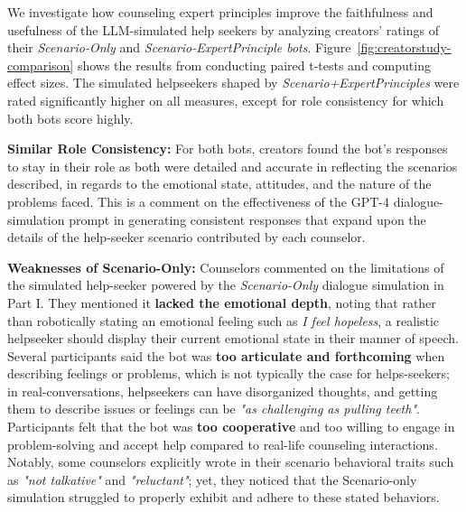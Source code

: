 We investigate how counseling expert principles improve the faithfulness and usefulness of the LLM-simulated help seekers by analyzing creators' ratings of their {\em Scenario-Only} and {\em Scenario-ExpertPrinciple bots}.  Figure~\ref{fig:creatorstudy-comparison} shows the results from conducting paired t-tests and computing effect sizes. The simulated helpseekers shaped by \textit{Scenario+ExpertPrinciples} were rated significantly higher on all measures, except for role consistency for which both bots score highly.

\textbf{Similar Role Consistency:} For both bots, creators found the bot's responses to stay in their role as both were detailed and accurate in reflecting the scenarios described, in regards to the emotional state, attitudes, and the nature of the problems faced. This is a comment on the effectiveness of the GPT-4 dialogue-simulation prompt in generating consistent responses that expand upon the details of the help-seeker scenario contributed by each counselor.

\textbf{Weaknesses of Scenario-Only:} 
Counselors commented on the limitations of the simulated help-seeker powered by the \textit{Scenario-Only} dialogue simulation in Part I. They mentioned it \textbf{lacked the emotional depth}, noting that rather than robotically stating an emotional feeling such as \textit{I feel hopeless}, a realistic helpseeker should display their current emotional state in their manner of speech. 
 Several participants said the bot was \textbf{too articulate and forthcoming} when describing feelings or problems, which is not typically the case for helps-seekers; in real-conversations, helpseekers can have disorganized thoughts, and getting them to describe issues or feelings can be \textit{"as challenging as pulling teeth"}. Participants felt that the bot was \textbf{too cooperative} and too willing to engage in problem-solving and accept help compared to real-life counseling interactions. Notably, some counselors explicitly wrote in their scenario behavioral traits such as \textit{"not talkative"} and \textit{"reluctant"}; yet, they noticed that the Scenario-only simulation struggled to properly exhibit and adhere to these stated behaviors.

